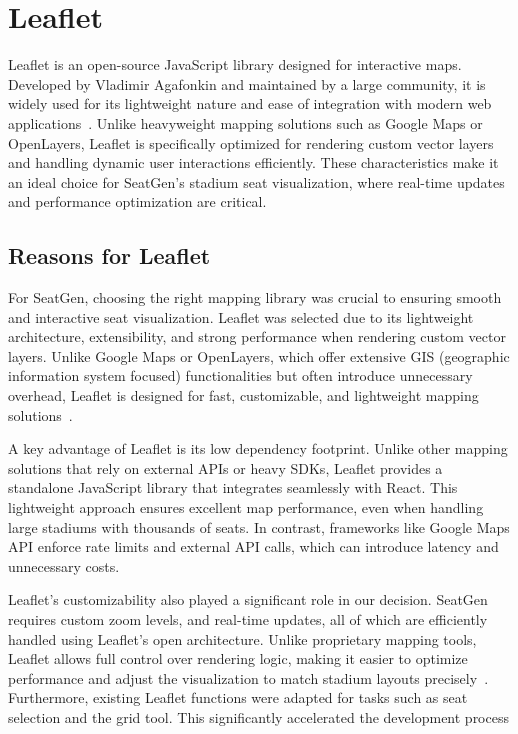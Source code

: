 \section{Leaflet}
Leaflet is an open-source JavaScript library designed for interactive maps. Developed by Vladimir Agafonkin and maintained by a large community, it is widely used for its lightweight nature and ease of integration with modern web applications~\cite{Leaflet}. Unlike heavyweight mapping solutions such as Google Maps or OpenLayers, Leaflet is specifically optimized for rendering custom vector layers and handling dynamic user interactions efficiently. These characteristics make it an ideal choice for SeatGen’s stadium seat visualization, where real-time updates and performance optimization are critical.

\subsection{Reasons for Leaflet}
For SeatGen, choosing the right mapping library was crucial to ensuring smooth and interactive seat visualization. Leaflet was selected due to its lightweight architecture, extensibility, and strong performance when rendering custom vector layers. Unlike Google Maps or OpenLayers, which offer extensive GIS (geographic information system focused) functionalities but often introduce unnecessary overhead, Leaflet is designed for fast, customizable, and lightweight mapping solutions~\cite{Leaflet}. 

A key advantage of Leaflet is its low dependency footprint. Unlike other mapping solutions that rely on external APIs or heavy SDKs, Leaflet provides a standalone JavaScript library that integrates seamlessly with React. This lightweight approach ensures excellent map performance, even when handling large stadiums with thousands of seats. In contrast, frameworks like Google Maps API enforce rate limits and external API calls, which can introduce latency and unnecessary costs.

Leaflet’s customizability also played a significant role in our decision. SeatGen requires custom zoom levels, and real-time updates, all of which are efficiently handled using Leaflet’s open architecture. Unlike proprietary mapping tools, Leaflet allows full control over rendering logic, making it easier to optimize performance and adjust the visualization to match stadium layouts precisely~\cite{Leaflet}. Furthermore, existing Leaflet functions were adapted for tasks such as seat selection and the grid tool. This significantly accelerated the development process

